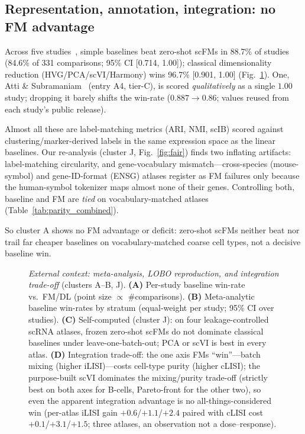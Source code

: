 \documentclass[journal]{IEEEtran}
\begin{document}
\subsection{Representation, annotation, integration: no FM advantage}
Across five studies~\cite{kedzierska2025,boiarsky2024,wu2025,atti2025,bendidi2024}, simple baselines beat zero-shot scFMs in 88.7\% of studies (84.6\% of 331 comparisons; 95\% CI [0.714, 1.00]); classical dimensionality reduction (HVG/PCA/scVI/Harmony) wins 96.7\% [0.901, 1.00] (Fig.~\ref{fig:context}). One, Atti \& Subramaniam~\cite{atti2025} (entry A4, tier-C), is scored \emph{qualitatively} as a single $1.00$ study; dropping it barely shifts the win-rate ($0.887\!\to\!0.86$; values reused from each study's public release).

Almost all these are label-matching metrics (ARI, NMI, scIB) scored against clustering/marker-derived labels in the same expression space as the linear baselines. Our re-analysis (cluster J, Fig.~\ref{fig:fair}) finds two inflating artifacts: label-matching circularity, and gene-vocabulary mismatch---cross-species (mouse-symbol) and gene-ID-format (ENSG) atlases register as FM failures only because the human-symbol tokenizer maps almost none of their genes. Controlling both, baseline and FM are \emph{tied} on vocabulary-matched atlases (Table~\ref{tab:parity_combined}).

So cluster A shows no FM advantage or deficit: zero-shot scFMs neither beat nor trail far cheaper baselines on vocabulary-matched coarse cell types, not a decisive baseline win.

\begin{figure}[!t]\centering
\resizebox{\textwidth}{!}{}
\caption{\emph{External context: meta-analysis, LOBO reproduction, and integration trade-off} (clusters A--B, J). \textbf{(A)} Per-study baseline win-rate vs.\ FM/DL (point size $\propto$ \#comparisons). \textbf{(B)} Meta-analytic baseline win-rates by stratum (equal-weight per study; 95\% CI over studies). \textbf{(C)} Self-computed (cluster J): on four leakage-controlled scRNA atlases, frozen zero-shot scFMs do not dominate classical baselines under leave-one-batch-out; PCA or scVI is best in every atlas. \textbf{(D)} Integration trade-off: the one axis FMs ``win''---batch mixing (higher iLISI)---costs cell-type purity (higher cLISI); the purpose-built scVI dominates the mixing/purity trade-off (strictly best on both axes for B-cells, Pareto-front for the other two), so even the apparent integration advantage is no all-things-considered win (per-atlas iLISI gain $+0.6$/$+1.1$/$+2.4$ paired with cLISI cost $+0.1$/$+3.1$/$+1.5$; three atlases, an observation not a dose--response).}\label{fig:context}\end{figure}
\end{document}
